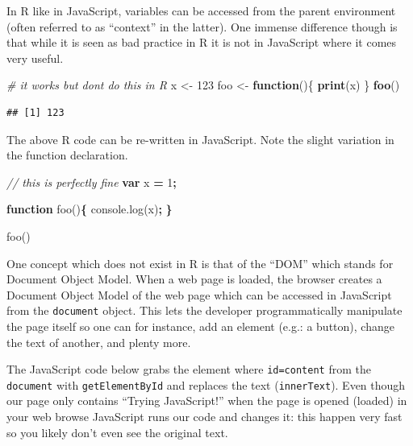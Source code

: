 \documentclass[
]{krantz}
\makeatletter
\newenvironment{Shaded}{\begin{snugshade}}{\end{snugshade}}
\newcommand{\AttributeTok}[1]{\textcolor[rgb]{0.61,0.61,0.61}{#1}}
\newcommand{\CommentTok}[1]{\textcolor[rgb]{0.37,0.37,0.37}{\textit{#1}}}
\newcommand{\ControlFlowTok}[1]{\textcolor[rgb]{0.27,0.27,0.27}{\textbf{#1}}}
\newcommand{\DecValTok}[1]{\textcolor[rgb]{0.06,0.06,0.06}{#1}}
\newcommand{\KeywordTok}[1]{\textcolor[rgb]{0.27,0.27,0.27}{\textbf{#1}}}
\newcommand{\NormalTok}[1]{#1}
\newcommand{\OperatorTok}[1]{\textcolor[rgb]{0.43,0.43,0.43}{\textbf{#1}}}
\newcommand{\StringTok}[1]{\textcolor[rgb]{0.5,0.5,0.5}{#1}}
\newcommand{\VariableTok}[1]{\textcolor[rgb]{0,0,0}{#1}}
\newenvironment{kframe}{%
\medskip{}
\setlength{\fboxsep}{.8em}
 \def\at@end@of@kframe{}%
 \ifinner\ifhmode%
  \def\at@end@of@kframe{\end{minipage}}%
  \begin{minipage}{\columnwidth}%
 \fi\fi%
 \def\FrameCommand##1{\hskip\@totalleftmargin \hskip-\fboxsep
 \colorbox{shadecolor}{##1}\hskip-\fboxsep
     \hskip-\linewidth \hskip-\@totalleftmargin \hskip\columnwidth}%
 \MakeFramed {\advance\hsize-\width
   \@totalleftmargin\z@ \linewidth\hsize
   \@setminipage}}%
 {\par\unskip\endMakeFramed%
 \at@end@of@kframe}
\renewenvironment{Shaded}{\begin{kframe}}{\end{kframe}}
\makeatother
\begin{document}
In R like in JavaScript, variables can be accessed from the parent environment (often referred to as ``context'' in the latter). One immense difference though is that while it is seen as bad practice in R it is not in JavaScript where it comes very useful.

\begin{Shaded}
\begin{Highlighting}[]
\CommentTok{\# it works but don\textquotesingle{}t do this in R}
\NormalTok{x <{-}}\StringTok{ }\DecValTok{123}
\NormalTok{foo <{-}}\StringTok{ }\ControlFlowTok{function}\NormalTok{()\{}
  \KeywordTok{print}\NormalTok{(x)}
\NormalTok{\}}
\KeywordTok{foo}\NormalTok{()}
\end{Highlighting}
\end{Shaded}

\begin{verbatim}
## [1] 123
\end{verbatim}

The above R code can be re-written in JavaScript. Note the slight variation in the function declaration.

\begin{Shaded}
\begin{Highlighting}[]
\CommentTok{// this is perfectly fine}
\KeywordTok{var}\NormalTok{ x }\OperatorTok{=} \DecValTok{1}\OperatorTok{;}

\KeywordTok{function} \AttributeTok{foo}\NormalTok{()}\OperatorTok{\{}
  \VariableTok{console}\NormalTok{.}\AttributeTok{log}\NormalTok{(x)}\OperatorTok{;} 
\OperatorTok{\}}

\AttributeTok{foo}\NormalTok{()}
\end{Highlighting}
\end{Shaded}

One concept which does not exist in R is that of the ``DOM'' which stands for Document Object Model. When a web page is loaded, the browser creates a Document Object Model of the web page which can be accessed in JavaScript from the \texttt{document} object. This lets the developer programmatically manipulate the page itself so one can for instance, add an element (e.g.: a button), change the text of another, and plenty more.

The JavaScript code below grabs the element where \texttt{id=\textquotesingle{}content\textquotesingle{}} from the \texttt{document} with \texttt{getElementById} and replaces the text (\texttt{innerText}). Even though our page only contains ``Trying JavaScript!'' when the page is opened (loaded) in your web browse JavaScript runs our code and changes it: this happen very fast so you likely don't even see the original text.
\end{document}
